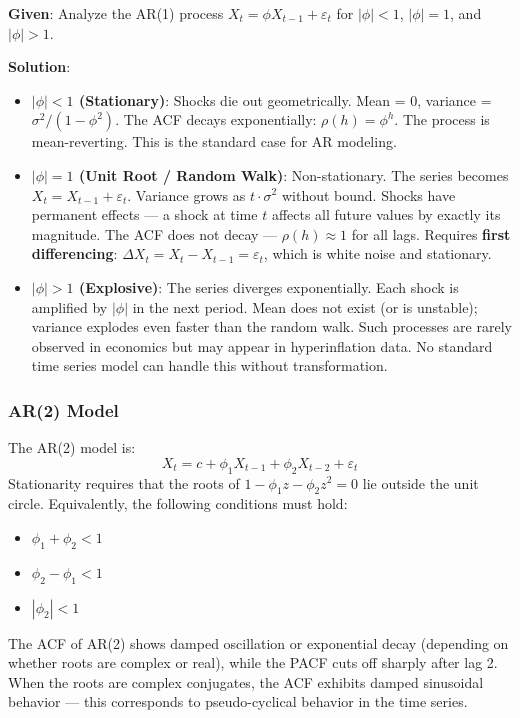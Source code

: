 \documentclass[11pt,a4paper]{article}
\begin{document}
\begin{tcolorbox}[colback=green!5!white,colframe=green!75!black,title=\textbf{Worked Example 2: AR(1) Unit Root Analysis}]
\textbf{Given}: Analyze the AR(1) process $X_t = \phi X_{t-1} + \varepsilon_t$ for $|\phi| < 1$, $|\phi| = 1$, and $|\phi| > 1$.

\textbf{Solution}:
\begin{itemize}
    \item \textbf{$|\phi| < 1$ (Stationary)}: Shocks die out geometrically. Mean = 0, variance = $\sigma^2/(1-\phi^2)$. The ACF decays exponentially: $\rho(h) = \phi^h$. The process is mean-reverting. This is the standard case for AR modeling.
    \item \textbf{$|\phi| = 1$ (Unit Root / Random Walk)}: Non-stationary. The series becomes $X_t = X_{t-1} + \varepsilon_t$. Variance grows as $t \cdot \sigma^2$ without bound. Shocks have permanent effects --- a shock at time $t$ affects all future values by exactly its magnitude. The ACF does not decay --- $\rho(h) \approx 1$ for all lags. Requires \textbf{first differencing}: $\Delta X_t = X_t - X_{t-1} = \varepsilon_t$, which is white noise and stationary.
    \item \textbf{$|\phi| > 1$ (Explosive)}: The series diverges exponentially. Each shock is amplified by $|\phi|$ in the next period. Mean does not exist (or is unstable); variance explodes even faster than the random walk. Such processes are rarely observed in economics but may appear in hyperinflation data. No standard time series model can handle this without transformation.
\end{itemize}
\end{tcolorbox}

\subsubsection{AR(2) Model}

The AR(2) model is:
\[
X_t = c + \phi_1 X_{t-1} + \phi_2 X_{t-2} + \varepsilon_t
\]
Stationarity requires that the roots of $1 - \phi_1 z - \phi_2 z^2 = 0$ lie outside the unit circle. Equivalently, the following conditions must hold:
\begin{itemize}
    \item $\phi_1 + \phi_2 < 1$
    \item $\phi_2 - \phi_1 < 1$
    \item $|\phi_2| < 1$
\end{itemize}
The ACF of AR(2) shows damped oscillation or exponential decay (depending on whether roots are complex or real), while the PACF cuts off sharply after lag 2. When the roots are complex conjugates, the ACF exhibits damped sinusoidal behavior --- this corresponds to pseudo-cyclical behavior in the time series.
\end{document}

